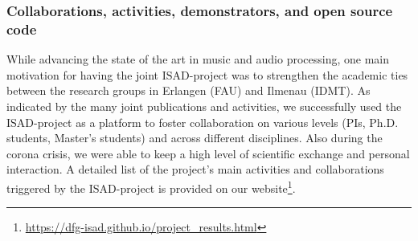 \documentclass[11pt,a4paper]{article}
\def\PN{\mathrm{ISAD}}
\newcommand{\egc}{e.g.,\ }
\newenvironment{itemizePacked}{
\begin{itemize}
  \setlength{\itemsep}{1pt}
  \setlength{\parskip}{0pt}
  \setlength{\parsep}{0pt}
  \renewcommand{\labelitemi}{$\bullet$}
}{\end{itemize}}
\newcommand{\meinard}[1]{{\color{red} #1}}
\theoremstyle{plain} \newtheorem{define}{Definition}[section]
\begin{document}
{%
\subsubsection*{Collaborations, activities, demonstrators, and open source code}
\label{sec:activities}

%
While advancing the state of the art in music and audio processing, one main motivation for having the joint $\PN$-project was to strengthen the academic ties between the research groups in Erlangen (FAU) and Ilmenau (IDMT). As indicated by the many joint publications and activities, we successfully used the $\PN$-project as a platform to foster collaboration on various levels (PIs, Ph.D. students, Master's students) and across different disciplines. Also during the corona crisis, we were able to keep a high level of scientific exchange and personal interaction. 
%
A detailed list of the project's main activities and collaborations triggered by the $\PN$-project is provided on our website\footnote{\label{pro_res_url}\url{https://dfg-isad.github.io/project_results.html}}.





}
\end{document}
